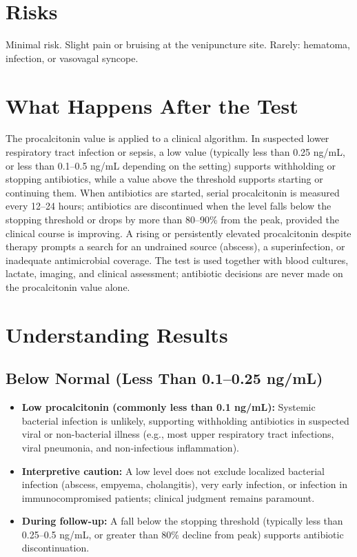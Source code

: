 \section*{Risks}
Minimal risk. Slight pain or bruising at the venipuncture site. Rarely: hematoma, infection, or vasovagal syncope.

\section*{What Happens After the Test}
The procalcitonin value is applied to a clinical algorithm. In suspected lower respiratory tract infection or sepsis, a low value (typically less than 0.25 ng/mL, or less than 0.1--0.5 ng/mL depending on the setting) supports withholding or stopping antibiotics, while a value above the threshold supports starting or continuing them. When antibiotics are started, serial procalcitonin is measured every 12--24 hours; antibiotics are discontinued when the level falls below the stopping threshold or drops by more than 80--90\% from the peak, provided the clinical course is improving. A rising or persistently elevated procalcitonin despite therapy prompts a search for an undrained source (abscess), a superinfection, or inadequate antimicrobial coverage. The test is used together with blood cultures, lactate, imaging, and clinical assessment; antibiotic decisions are never made on the procalcitonin value alone.

\section*{Understanding Results}

\subsection*{Below Normal (Less Than 0.1--0.25 ng/mL)}
\begin{itemize}
  \item \textbf{Low procalcitonin (commonly less than 0.1 ng/mL):} Systemic bacterial infection is unlikely, supporting withholding antibiotics in suspected viral or non-bacterial illness (e.g., most upper respiratory tract infections, viral pneumonia, and non-infectious inflammation).
  \item \textbf{Interpretive caution:} A low level does not exclude localized bacterial infection (abscess, empyema, cholangitis), very early infection, or infection in immunocompromised patients; clinical judgment remains paramount.
  \item \textbf{During follow-up:} A fall below the stopping threshold (typically less than 0.25--0.5 ng/mL, or greater than 80\% decline from peak) supports antibiotic discontinuation.
\end{itemize}

